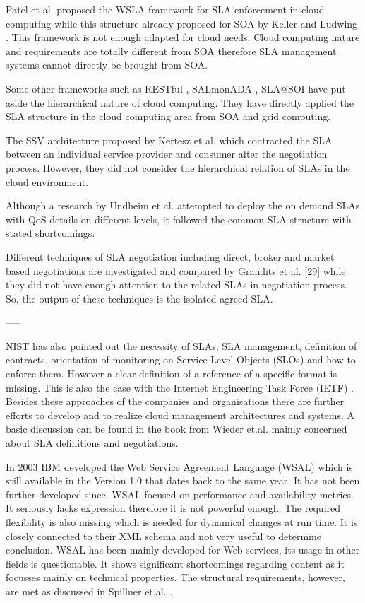 Patel et al. \cite{Patel2009ServiceLA} proposed the WSLA framework for SLA enforcement in cloud computing while this structure already proposed for SOA by Keller and Ludwing \cite{Ludwig03WSLA}. This framework is not enough adapted for cloud needs. Cloud computing nature and requirements are totally different from SOA therefore SLA management systems cannot directly be brought from SOA. 

Some other frameworks such as RESTful \cite{Kubert:2011:RIW:1967428.1967444}, SALmonADA \cite{6225938}, SLA@SOI \cite{slasoi2011} have put aside the hierarchical nature of cloud computing. They have directly applied the SLA structure in the cloud computing area from SOA and grid computing. 

The SSV architecture proposed by Kertesz et al. \cite{5739040}which contracted the SLA between an individual service provider and consumer after the negotiation process. However, they did not consider the hierarchical relation of SLAs in the cloud environment. 

Although a research by Undheim et al. \cite{6076508} attempted to deploy the on demand SLAs with QoS details on different levels, it followed the common SLA structure with stated shortcomings. 

Different techniques of SLA negotiation including direct, broker and market based negotiations are investigated and compared by Grandits et al. [29] while they did not have enough attention to the related SLAs in negotiation process. So, the output of these techniques is the isolated agreed SLA. 


-----

NIST \cite{Liu2011} has also pointed out the necessity of SLAs, SLA management, definition of contracts, orientation of monitoring on Service Level Objects (SLOs) and how to enforce them. However a clear definition of a reference of a specific format is missing. This is also the case with the Internet Engineering Task Force (IETF) \cite{Khasnabish2010}. Besides these approaches of the companies and organisations there are further efforts to develop and to realize cloud management architectures and systems. A basic discussion can be found in the book from Wieder et.al. \cite{Wieder2011} mainly concerned about SLA definitions and negotiations.

In 2003 IBM developed the Web Service Agreement Language (WSAL) \cite{Ludwig03WSLA} which is still available in the Version 1.0 that dates back to the same year. It has not been further developed since. WSAL focused on performance and availability metrics. It seriously lacks expression therefore it is not powerful enough. The required flexibility is also missing which is needed for dynamical changes at run time. It is closely connected to their XML schema and not very useful to determine conclusion.
WSAL has been mainly developed for Web services, its usage in other fields is questionable. It shows significant shortcomings regarding content as it focusses mainly on technical properties. The structural requirements, however, are met as discussed in Spillner et.al. \cite{Spillner2009}.

